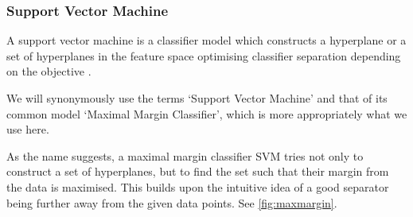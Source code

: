 
\subsubsection{Support Vector Machine}
A support vector machine is a classifier model which constructs a hyperplane or
a set of hyperplanes in the feature space optimising classifier separation
depending on the objective \cite{cortes1995support}.

We will synonymously use the terms `Support Vector Machine' and that of its
common model `Maximal Margin Classifier', which is more appropriately what we
use here.

As the name suggests, a maximal margin classifier SVM tries not only to
construct a set of hyperplanes, but to find the set such that their margin from
the data is maximised. This builds upon the intuitive idea of a good separator
being further away from the given data points. See \autoref{fig:maxmargin}.


